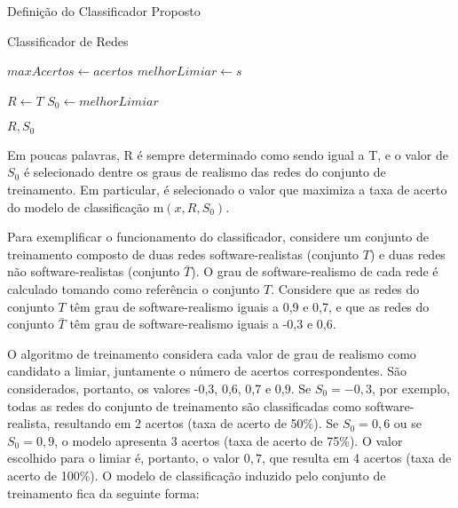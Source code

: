 \begin{section}{Definição do Classificador Proposto}
\begin{subsection}{Classificador de Redes}
\begin{algorithm}
\begin{algorithmic}
		\STATE $maxAcertos \gets acertos$
		\STATE $melhorLimiar \gets s$
	\ENDIF
\ENDFOR

\STATE $R \gets T$
\STATE $S_0 \gets melhorLimiar$

\RETURN $R, S_0$
\end{algorithmic}	
\end{algorithm}

	 
	
Em poucas palavras, R é sempre determinado como sendo igual a T, e o valor de $S_0$ é selecionado dentre os graus de realismo das redes do conjunto de treinamento. Em particular, é selecionado o valor que maximiza a taxa de acerto do modelo de classificação $\mathrm{m}(x, R, S_0)$.

Para exemplificar o funcionamento do classificador, considere um conjunto de treinamento composto de duas redes software-realistas (conjunto $T$) e duas redes não software-realistas (conjunto $\bar{T}$). O grau de software-realismo de cada rede é calculado tomando como referência o conjunto $T$. Considere que as redes do conjunto $T$ têm grau de software-realismo iguais a 0,9 e 0,7, e que as redes do conjunto $\bar{T}$ têm grau de software-realismo iguais a -0,3 e 0,6.

O algoritmo de treinamento considera cada valor de grau de realismo como candidato a limiar, juntamente o número de acertos correspondentes. São considerados, portanto, os valores -0,3, 0,6, 0,7 e 0,9. Se $S_0 = -0,3$, por exemplo, todas as redes do conjunto de treinamento são classificadas como software-realista, resultando em 2 acertos (taxa de acerto de 50\%). Se $S_0 = 0,6$ ou se $S_0 = 0,9$, o modelo apresenta 3 acertos (taxa de acerto de 75\%). O valor escolhido para o limiar é, portanto, o valor $0,7$, que resulta em 4 acertos (taxa de acerto de 100\%). O modelo de classificação induzido pelo conjunto de treinamento fica da seguinte forma:


\end{subsection}
\end{section}
